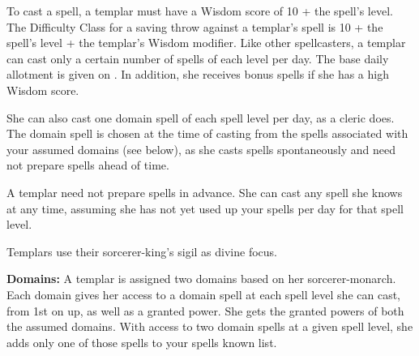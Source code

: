 To cast a spell, a templar must have a Wisdom score of 10 + the spell's level. The Difficulty Class for a saving throw against a templar's spell is 10 + the spell's level + the templar's Wisdom modifier. Like other spellcasters, a templar can cast only a certain number of spells of each level per day. The base daily allotment is given on . In addition, she receives bonus spells if she has a high Wisdom score.

She can also cast one domain spell of each spell level per day, as a cleric does. The domain spell is chosen at the time of casting from the spells associated with your assumed domains (see below), as she casts spells spontaneously and need not prepare spells ahead of time.

A templar need not prepare spells in advance. She can cast any spell she knows at any time, assuming she has not yet used up your spells per day for that spell level.

Templars use their sorcerer-king's sigil as divine focus.

\textbf{Domains:} A templar is assigned two domains based on her sorcerer-monarch. Each domain gives her access to a domain spell at each spell level she can cast, from 1st on up, as well as a granted power. She gets the granted powers of both the assumed domains. With access to two domain spells at a given spell level, she adds only one of those spells to your spells known list.


